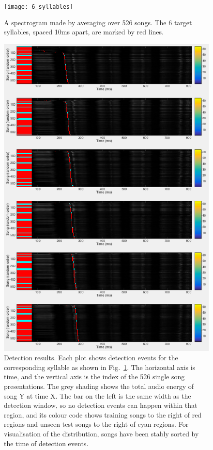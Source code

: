 \documentclass[10pt,letterpaper]{article}
\newcommand\fig[1]{Fig.~\ref{#1}}
\begin{document}
\begin{figure}
  \texttt{[image: 6\_syllables]}
  \caption{A spectrogram made by averaging over 526 songs. The 6
    target syllables, spaced 10ms apart, are marked by red lines.}
    \label{fig:sixsyllables}
\end{figure}

\begin{figure}
  \includegraphics[width=\textwidth]{6_syllables_out}
    \caption{Detection results. Each plot shows detection events for
      the corresponding syllable as shown in
      \fig{fig:sixsyllables}. The horizontal axis is time, and the
      vertical axis is the index of the 526 single song
      presentations. The grey shading shows the total audio energy of
      song Y at time X. The bar on the left is the same width as the
      detection window, so no detection events can happen within that
      region, and its colour code shows training songs to the right of
      red regions and unseen test songs to the right of cyan
      regions. For visualisation of the distribution, songs have been
      stably sorted by the time of detection events.}
  \label{fig:sixsyllables_out}
\end{figure}
\end{document}
